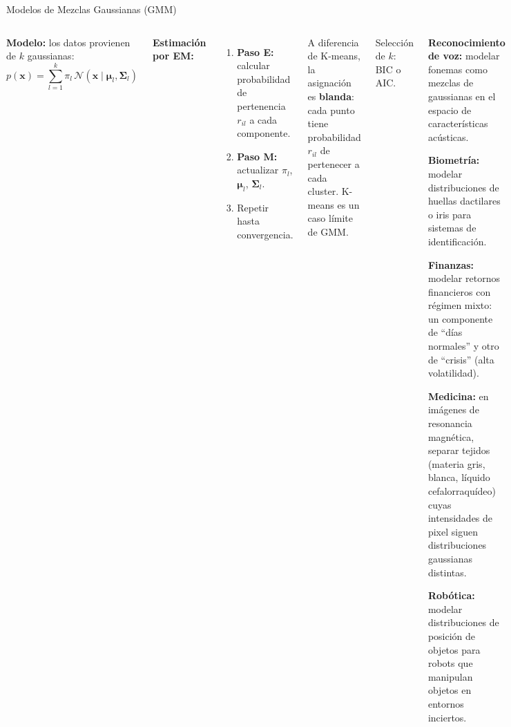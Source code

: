 \documentclass[aspectratio=169]{beamer}
\begin{document}
\begin{frame}{Modelos de Mezclas Gaussianas (GMM)}
\begin{columns}[T]
\textbf{Modelo:} los datos provienen de $k$ gaussianas:
\[
p(\mathbf{x}) = \sum_{l=1}^{k} \pi_l \,\mathcal{N}(\mathbf{x} \mid \boldsymbol{\mu}_l, \boldsymbol{\Sigma}_l)
\]

\medskip
\textbf{Estimación por EM:}
\begin{enumerate}
  \item \textbf{Paso E:} calcular probabilidad de pertenencia $r_{il}$ a cada componente.
  \item \textbf{Paso M:} actualizar $\pi_l$, $\boldsymbol{\mu}_l$, $\boldsymbol{\Sigma}_l$.
  \item Repetir hasta convergencia.
\end{enumerate}

\medskip
\begin{concepto}
A diferencia de K-means, la asignación es \textbf{blanda}: cada punto tiene probabilidad $r_{il}$ de pertenecer a cada cluster. K-means es un caso límite de GMM.
\end{concepto}

\medskip
Selección de $k$: BIC o AIC.

\begin{aplicacion}
\textbf{Reconocimiento de voz:} modelar fonemas como mezclas de gaussianas en el espacio de características acústicas.

\medskip
\textbf{Biometría:} modelar distribuciones de huellas dactilares o iris para sistemas de identificación.

\medskip
\textbf{Finanzas:} modelar retornos financieros con régimen mixto: un componente de ``días normales'' y otro de ``crisis'' (alta volatilidad).

\medskip
\textbf{Medicina:} en imágenes de resonancia magnética, separar tejidos (materia gris, blanca, líquido cefalorraquídeo) cuyas intensidades de pixel siguen distribuciones gaussianas distintas.

\medskip
\textbf{Robótica:} modelar distribuciones de posición de objetos para robots que manipulan objetos en entornos inciertos.
\end{aplicacion}
\end{columns}
\end{frame}
\end{document}
